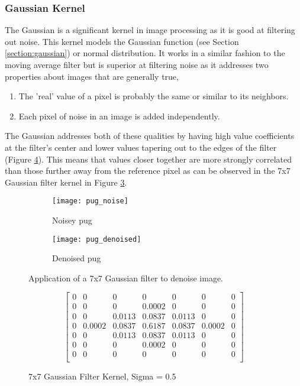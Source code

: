 \subsubsection{Gaussian Kernel}
\label{subsubsection:gauss_kernel}
The Gaussian is a significant kernel in image processing as it is good at filtering out noise. This kernel models the Gaussian function (see Section \ref{section:gaussian}) or normal distribution. It works in a similar fashion to the moving average filter but is superior at filtering noise as it addresses two properties about images that are generally true, 

\begin{enumerate}
    \item The 'real' value of a pixel is probably the same or similar to its neighbors. 
    \item Each pixel of noise in an image is added independently.
\end{enumerate}

The Gaussian addresses both of these qualities by having high value coefficients at the filter's center and lower values tapering out to the edges of the filter (Figure \ref{fig:gauss_kernel}). This means that values closer together are more strongly correlated than those further away from the reference pixel as can be observed in the 7x7 Gaussian filter kernel in Figure \ref{fig:pug_noise}.

\begin{figure}[H]
    \centering
    \begin{subfigure}[b]{0.3\textwidth}
        \texttt{[image: pug\_noise]}
        \caption{Noisey pug}
        \label{fig:pug_noise}
    \end{subfigure}
    \begin{subfigure}[b]{0.3\textwidth}
        \texttt{[image: pug\_denoised]}
        \caption{Denoised pug}
        \label{fig:pug_denoised}
    \end{subfigure}
    \caption{Application of a 7x7 Gaussian filter to denoise image.}
    \label{fig:pug_noise}
\end{figure}


\begin{figure}[H]
    \centering
    \[
    \begin{bmatrix}
       0 & 0 & 0 & 0 & 0 & 0 & 0 \\
       0 & 0 & 0 & 0.0002 & 0 & 0 & 0 \\
       0 & 0 & 0.0113  & 0.0837 & 0.0113  & 0 & 0 \\
       0 & 0.0002 & 0.0837 & 0.6187 & 0.0837 & 0.0002 & 0 \\
       0 & 0 & 0.0113 & 0.0837 & 0.0113 & 0 & 0 \\
       0 & 0 & 0 & 0.0002 & 0 & 0 & 0 \\
       0 & 0 & 0 & 0 & 0 & 0 & 0 \\
    \end{bmatrix}
    \]
    \caption{7x7 Gaussian Filter Kernel, Sigma = 0.5}
    \label{fig:gauss_kernel}
\end{figure}